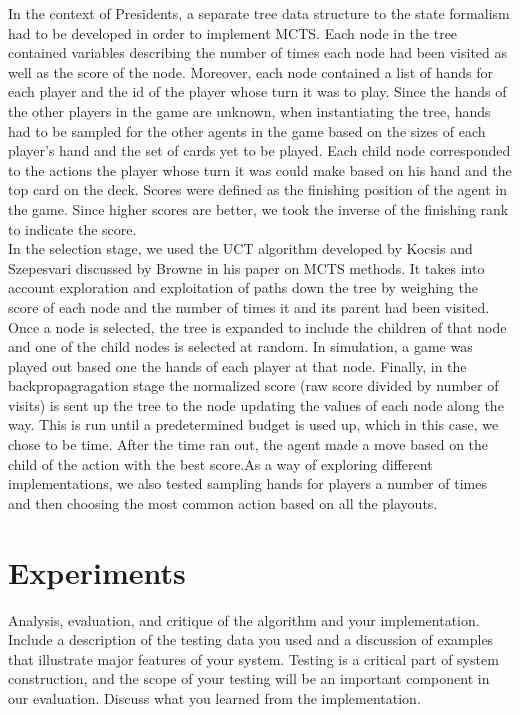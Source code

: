 \documentclass[11pt]{article}
\begin{document}
In the context of Presidents, a separate tree data structure to the state formalism had to be developed in order to implement MCTS. Each node in the tree contained variables describing the number of times each node had been visited as well as the score of the node. Moreover, each node contained a list of hands for each player and the id of the player whose turn it was to play. Since the hands of the other players in the game are unknown, when instantiating the tree, hands had to be sampled for the other agents in the game based on the sizes of each player's hand and the set of cards yet to be played. Each child node corresponded to the actions the player whose turn it was could make based on his hand and the top card on the deck. Scores were defined as the finishing position of the agent in the game. Since higher scores are better, we took the inverse of the finishing rank to indicate the score. \\

In the selection stage, we used the UCT algorithm developed by Kocsis and Szepesvari discussed by Browne in his paper on MCTS methods. It takes into account exploration and exploitation of paths down the tree by weighing the score of each node and the number of times it and its parent had been visited. Once a node is selected, the tree is expanded to include the children of that node and one of the child nodes is selected at random. In simulation, a game was played out based one the hands of each player at that node. Finally, in the backpropagragation stage the normalized score (raw score divided by number of visits) is sent up the tree to the node updating the values of each node along the way. This is run until a predetermined budget is used up, which in this case, we chose to be time. After the time ran out, the agent made a move based on the child of the action with the best score.As a way of exploring different implementations, we also tested sampling hands for players a number of times and then choosing the most common action based on all the playouts.



\section{Experiments}
Analysis, evaluation, and critique of the algorithm and your
implementation. Include a description of the testing data you used and
a discussion of examples that illustrate major features of your
system. Testing is a critical part of system construction, and the
scope of your testing will be an important component in our
evaluation. Discuss what you learned from the implementation.
\end{document}
